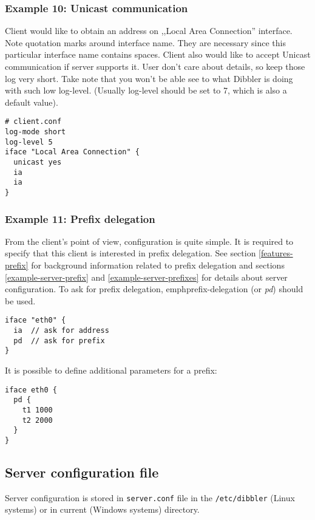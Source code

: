 \subsubsection{Example 10: Unicast communication}

Client would like to obtain an address on ,,Local Area Connection''
interface. Note quotation marks around
interface name. They are necessary since this particular interface name
contains spaces. Client also would like to accept Unicast
communication if server supports it. User don't care about
details, so keep those log very short. Take note that you won't be
able see to what Dibbler is doing with such low log-level. (Usually
log-level should be set to 7, which is also a default value).

\begin{lstlisting}
# client.conf
log-mode short
log-level 5
iface "Local Area Connection" {
  unicast yes
  ia
  ia
}
\end{lstlisting}

\subsubsection{Example 11: Prefix delegation}
\label{example-client-prefix}
From the client's point of view, configuration is quite simple. It is
required to specify that this client is interested in prefix
delegation. See section \ref{features-prefix} for background
information related to prefix delegation and sections
\ref{example-server-prefix} and \ref{example-server-prefixes} for
details about server configuration. To ask for prefix delegation, 
emph{prefix-delegation} (or \emph{pd}) should be used.

\begin{lstlisting}
iface "eth0" {
  ia  // ask for address
  pd  // ask for prefix
}
\end{lstlisting}

It is possible to define additional parameters for a prefix:

\begin{lstlisting}
iface eth0 {
  pd {
    t1 1000
    t2 2000
  }
}
\end{lstlisting}

\subsection{Server configuration file}

Server configuration is stored in \verb+server.conf+ file in the
\verb+/etc/dibbler+ (Linux systems) or in current (Windows systems)
directory. 

